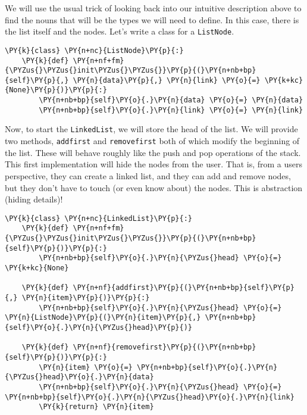 We will use the usual trick of looking back into our intuitive description above to find the nouns that will be the types we will need to define.
In this case, there is the list itself and the nodes.
Let's write a class for a \texttt{ListNode}.

\begin{Verbatim}[commandchars=\\\{\}]
\PY{k}{class} \PY{n+nc}{ListNode}\PY{p}{:}
    \PY{k}{def} \PY{n+nf+fm}{\PYZus{}\PYZus{}init\PYZus{}\PYZus{}}\PY{p}{(}\PY{n+nb+bp}{self}\PY{p}{,} \PY{n}{data}\PY{p}{,} \PY{n}{link} \PY{o}{=} \PY{k+kc}{None}\PY{p}{)}\PY{p}{:}
        \PY{n+nb+bp}{self}\PY{o}{.}\PY{n}{data} \PY{o}{=} \PY{n}{data}
        \PY{n+nb+bp}{self}\PY{o}{.}\PY{n}{link} \PY{o}{=} \PY{n}{link}
\end{Verbatim}



Now, to start the \texttt{LinkedList}, we will store the head of the list.
We will provide two methods, \texttt{addfirst} and \texttt{removefirst} both of which modify the beginning of the list.
These will behave roughly like the push and pop operations of the stack.
This first implementation will hide the nodes from the user.
That is, from a users perspective, they can create a linked list, and they can add and remove nodes, but they don't have to touch (or even know about) the nodes.
This is abstraction (hiding details)!

\begin{Verbatim}[commandchars=\\\{\}]
\PY{k}{class} \PY{n+nc}{LinkedList}\PY{p}{:}
    \PY{k}{def} \PY{n+nf+fm}{\PYZus{}\PYZus{}init\PYZus{}\PYZus{}}\PY{p}{(}\PY{n+nb+bp}{self}\PY{p}{)}\PY{p}{:}
        \PY{n+nb+bp}{self}\PY{o}{.}\PY{n}{\PYZus{}head} \PY{o}{=} \PY{k+kc}{None}

    \PY{k}{def} \PY{n+nf}{addfirst}\PY{p}{(}\PY{n+nb+bp}{self}\PY{p}{,} \PY{n}{item}\PY{p}{)}\PY{p}{:}
        \PY{n+nb+bp}{self}\PY{o}{.}\PY{n}{\PYZus{}head} \PY{o}{=} \PY{n}{ListNode}\PY{p}{(}\PY{n}{item}\PY{p}{,} \PY{n+nb+bp}{self}\PY{o}{.}\PY{n}{\PYZus{}head}\PY{p}{)}

    \PY{k}{def} \PY{n+nf}{removefirst}\PY{p}{(}\PY{n+nb+bp}{self}\PY{p}{)}\PY{p}{:}
        \PY{n}{item} \PY{o}{=} \PY{n+nb+bp}{self}\PY{o}{.}\PY{n}{\PYZus{}head}\PY{o}{.}\PY{n}{data}
        \PY{n+nb+bp}{self}\PY{o}{.}\PY{n}{\PYZus{}head} \PY{o}{=} \PY{n+nb+bp}{self}\PY{o}{.}\PY{n}{\PYZus{}head}\PY{o}{.}\PY{n}{link}
        \PY{k}{return} \PY{n}{item}
\end{Verbatim}


